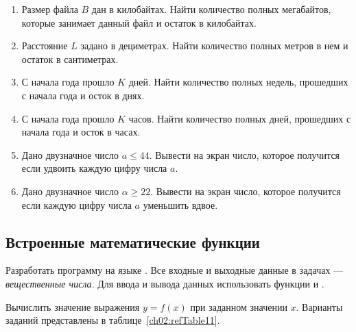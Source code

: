 \begin{enumerate}
\item Размер файла $B$ дан в килобайтах. Найти
количество полных мегабайтов, которые занимает данный файл и остаток в килобайтах.
\item Расстояние $L$ задано в дециметрах. Найти количество полных метров в нем и остаток в
сантиметрах.
\item С начала года прошло $K$ дней. Найти количество полных недель, прошедших с начала года и осток в
днях.
\item С начала года прошло $K$ часов. Найти количество полных дней, прошедших с начала года и осток в
часах.
\item Дано двузначное число $a\leqslant 44$. Вывести на экран число, которое получится если удвоить каждую цифру
числа $a$.
\item Дано двузначное число $\alpha\geqslant 22$. Вывести на экран число, которое получится если каждую цифру числа
$a$ уменьшить вдвое.
\end{enumerate}

\subsection[Встроенные математические функции]{Встроенные математические функции}
Разработать программу на языке . Все входные и выходные данные в задачах --- \emph{вещественные числа}.
Для ввода и вывода данных использовать функции  и .

Вычислить значение выражения $y=f(x)$ при заданном значении
$x$. Варианты заданий представлены в таблице~\ref{ch02:refTable11}.

